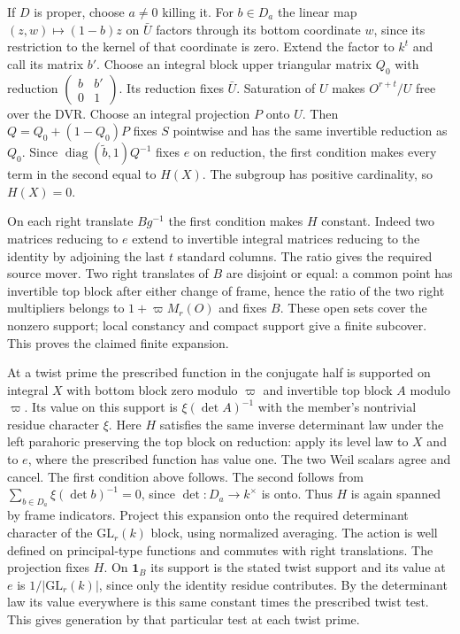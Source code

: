 If $D$ is proper, choose $a\ne0$ killing it. For $b\in D_a$ the
linear map $(z,w)\mapsto(1-b)z$ on $\bar U$ factors through its
bottom coordinate $w$, since its restriction to the kernel of that
coordinate is zero. Extend the factor to $k^t$ and call its matrix
$b'$. Choose an integral block upper triangular matrix $Q_0$ with
reduction $\left(\begin{smallmatrix}b&b'\\0&1\end{smallmatrix}\right)$.
Its reduction fixes $\bar U$. Saturation of $U$ makes $O^{r+t}/U$
free over the DVR. Choose an integral projection $P$ onto $U$.
Then $Q=Q_0+(1-Q_0)P$ fixes $S$ pointwise and has the same
invertible reduction as $Q_0$. Since
$\operatorname{diag}(\widetilde b,1)Q^{-1}$ fixes $e$ on reduction,
the first condition makes every term in the second equal to $H(X)$.
The subgroup has positive cardinality, so $H(X)=0$.

On each right translate $B g^{-1}$ the first condition makes $H$
constant. Indeed two matrices reducing to $e$ extend to invertible
integral matrices reducing to the identity by adjoining the last
$t$ standard columns. The ratio gives the required source mover.
Two right translates of $B$ are disjoint or equal: a common point
has invertible top block after either change of frame, hence the
ratio of the two right multipliers belongs to
$1+\varpi M_r(O)$ and fixes $B$. These open sets cover the
nonzero support; local constancy and compact support give a finite
subcover. This proves the claimed finite expansion.

At a twist prime the prescribed function in the conjugate half is
supported on integral $X$ with bottom block zero modulo $\varpi$
and invertible top block $A$ modulo $\varpi$. Its value on this
support is $\xi(\det A)^{-1}$ with the member's nontrivial
residue character $\xi$. Here $H$ satisfies the same inverse
determinant law under the left parahoric preserving the top block
on reduction: apply its level law to $X$ and to $e$, where the
prescribed function has value one. The two Weil scalars agree and
cancel. The first condition above follows. The second follows from
$\sum_{b\in D_a}\xi(\det b)^{-1}=0$, since $\det:D_a\to k^\times$
is onto. Thus $H$ is again spanned by frame indicators. Project this
expansion onto the required determinant character of the
$\mathrm{GL}_r(k)$ block, using normalized averaging. The action
is well defined on principal-type functions and commutes with right
translations. The projection fixes $H$. On $\mathbf1_B$ its support
is the stated twist support and its value at $e$ is
$1/|\mathrm{GL}_r(k)|$, since only the identity residue contributes.
By the determinant law its value everywhere is this same constant
times the prescribed twist test. This gives generation by that
particular test at each twist prime.

